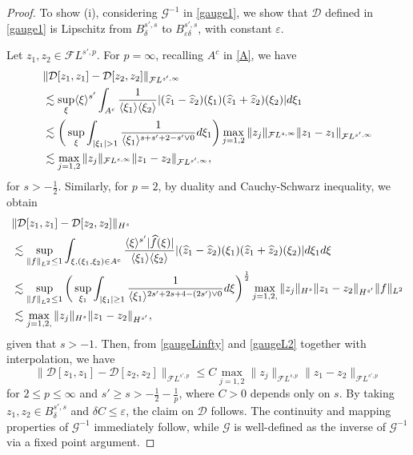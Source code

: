 \documentclass[a4paper,
11pt,  reqno]{amsart}
\newcommand{\jap}[1]{\langle #1 \rangle}
\newcommand{\5}{\textup{V}}
\newcommand{\FL}{\mathcal{F} L}
\newcommand{\ft}{\widehat}
\newcommand{\les}{\lesssim}
\newcommand{\dl}{\delta}
\newcommand{\eps}{\varepsilon}
\theoremstyle{remark}
\newcommand{\jb}[1]
{\langle #1 \rangle}
\newcommand{\Gc}{\mathcal{G}}
\numberwithin{equation}{section}
\numberwithin{theorem}{section}
\newcommand{\DD}{\mathcal{D}}
\begin{document}
\begin{proof}
To show (i), considering $\Gc^{-1}$ in \eqref{gauge1}, we show that $\DD$ defined in \eqref{gauge1} is Lipschitz from $B^{s',s}_\dl$ to $B^{s',s}_{\eps\dl}$, with constant $\eps$.

Let $z_1,z_2 \in \FL^{s',p}$. For $p=\infty$, recalling $A^c$ in \eqref{A}, we have
\begin{align}
&
\|\DD[z_1,z_1] - \DD[z_2,z_2]\|_{\mathcal{F}L^{s',\infty}}
\\
&
\les
\sup_\xi \jb{\xi}^{s'} \int_{A^c}
\frac{1}{\jap{\xi_{1}}\jap{\xi_{2}}} | (\ft{z}_1 - \ft{z}_2)(\xi_1) (\ft{z}_1 + \ft{z}_2)(\xi_2) |   d\xi_{1}
\notag
\\
&\les
\bigg( \sup_{\xi} \int_{|\xi_{1}|>1} \frac{1}{\jap{\xi_{1}}^{s+s'+2 - s'\lor 0 }} d\xi_{1}
\bigg)
 \max_{j=1,2} \|z_j\|_{\mathcal{F}L^{s,\infty}}
\|z_1 - z_1\|_{\mathcal{F}L^{s',\infty}}
\notag
\\
& \les
 \max_{j=1,2} \|z_j\|_{\mathcal{F}L^{s,\infty}}
\|z_1-z_2\|_{ \mathcal{F}L^{s',\infty}},
\label{gaugeLinfty}
\end{align}
for $s>-\frac12$.
Similarly, for $p=2$, by duality and Cauchy-Schwarz inequality, we obtain
\begin{align}
&
\|\DD[z_1,z_1] - \DD[z_2,z_2] \|_{H^s}
\\
&
\les
\sup_{\|f\|_{L^2} \le 1 }
	 \int_{\xi, (\xi_1,\xi_2)\in A^c} \frac{\jap{\xi}^{s'}|\widehat{f}(\xi)|}{\jap{\xi_{1}}\jap{\xi_{2}}} | (\ft{z}_1 - \ft{z}_2)(\xi_1) (\ft{z}_1 + \ft{z}_2)(\xi_2) |   d\xi_{1}d\xi
     \notag
    \\
    & \les \sup_{\|f\|_{L^2 } \le 1}  \bigg( \sup_{\xi_{1}}  \int_{|\xi_1| \ge 1} \frac{1}{\jap{\xi_{1}}^{2s'+2s+4 - (2s') \lor 0 }}d\xi \bigg)^{\frac{1}{2}}
\max_{j=1,2,} \|z_j\|_{H^s}
\|z_1-z_2\|_{H^{s'}}\|f\|_{L^2}
\notag
\\
&
\lesssim
\max_{j=1,2,} \|z_j\|_{H^s}
\|z_1-z_2\|_{H^{s'}} ,
\label{gaugeL2}
\end{align}
given that $s>-1$.
Then, from \eqref{gaugeLinfty} and \eqref{gaugeL2} together with interpolation, we have
\begin{equation}\label{eq:est_D}
		\|\DD[z_1,z_1] - \DD[z_2,z_2]\|_{ \mathcal{F}L^{s',p}}
        \le C
\max_{j=1,2} \| z_j\|_{\FL^{s, p}} \|z_1-z_2\|_{ \mathcal{F}L^{s',p}}
\end{equation}
for $2 \le p \le \infty$ and $s'\ge s> -\frac12 - \frac1p$, where $C>0$ depends only on $s$.
By taking $z_1,z_2 \in B^{s',s}_\dl$ and $\dl C \le \eps$, the claim on $\DD$ follows.
The continuity and mapping properties of $\Gc^{-1}$ immediately follow, while $\Gc$ is well-defined as the inverse of $\Gc^{-1}$ via a fixed point argument.



\end{proof}
\end{document}
